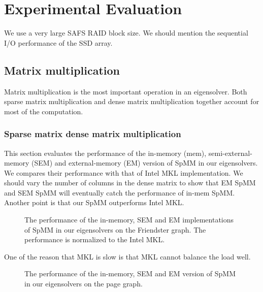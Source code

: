 \section{Experimental Evaluation}

We use a very large SAFS RAID block size. We should mention the sequential I/O performance
of the SSD array.

\subsection{Matrix multiplication}

Matrix multiplication is the most important operation in an eigensolver.
Both sparse matrix multiplication and dense matrix multiplication together
account for most of the computation.

\subsubsection{Sparse matrix dense matrix multiplication}
This section evaluates the performance of the in-memory (mem), semi-external-memory
(SEM) and external-memory (EM) version of SpMM in our eigensolvers. We compares
their performance with that of Intel MKL implementation.
We should vary the number of columns in the dense matrix to show that EM SpMM and SEM SpMM will
eventually catch the performance of in-mem SpMM. Another point is that our SpMM outperforms
Intel MKL.


\begin{figure}
	\begin{center}
		\footnotesize
		\vspace{-15pt}
		
		\vspace{-15pt}
		\caption{The performance of the in-memory, SEM and EM implementations
			of SpMM in our eigensolvers on the Friendster graph. The performance
			is normalized to the Intel MKL. }
		\label{perf:spmm}
	\end{center}
\end{figure}

One of the reason that MKL is slow is that MKL cannot balance the load well.

\begin{figure}
	\begin{center}
		\footnotesize
		\vspace{-15pt}
		
		\vspace{-15pt}
		\caption{The performance of the in-memory, SEM and EM version of SpMM
			in our eigensolvers on the page graph.}
		\label{perf:spmm_pg}
	\end{center}
\end{figure}

